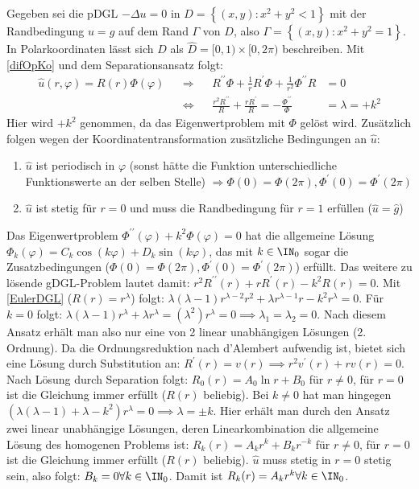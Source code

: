    {\color{gray} Gegeben sei die pDGL $-\Delta u=0  \text{ in } D=\left\{(x, y): x^2+y^2<1\right\}$ mit der Randbedingung $u=g$ auf dem Rand $\Gamma$ von $D$, also $\Gamma=\left\{(x, y): x^2+y^2=1\right\}$. In Polarkoordinaten lässt sich $D$ als $\hat{D}=[0,1) \times[0,2 \pi)$ beschreiben. Mit \ref{difOpKo} und dem Separationsansatz folgt: 
    	\begin{align*}
    		\hat{u}(r,\varphi)=R(r)\Phi(\varphi)&&\Rightarrow&& R^{\prime\prime}\Phi+\frac{1}{r}R^\prime\Phi+\frac{1}{r^2}\Phi^{\prime\prime}R&=0\\
    		&&\Leftrightarrow&& \frac{r^2R^{\prime\prime}}{R}+\frac{rR^\prime}{R}=-\frac{\Phi^{\prime\prime}}{\Phi}&=\lambda=+k^2
    	\end{align*}
    	Hier wird $+k^2$ genommen, da das Eigenwertproblem mit $\Phi$ gelöst wird. Zusätzlich folgen wegen der Koordinatentransformation zusätzliche Bedingungen an $\hat{u}$:
    	\begin{enumerate}
    		\item $\hat{u}$ ist periodisch in $\varphi$ (sonst hätte die Funktion unterschiedliche Funktionswerte an der selben Stelle) $\Rightarrow \Phi(0)=\Phi(2\pi),\Phi^\prime(0)=\Phi^\prime(2\pi) $ 
    		\item $\hat{u}$ ist stetig für $r=0$ und muss die Randbedingung für $r=1$ erfüllen ($\hat{u}=\hat{g}$)
    	\end{enumerate}
    	Das Eigenwertproblem $\Phi^{\prime\prime}(\varphi)+k^2\Phi(\varphi)=0$ hat die allgemeine Lösung $\Phi_k(\varphi)=C_k\cos (k\varphi)+D_k\sin (k\varphi)$, das mit $k\in \IN_0$ sogar die Zusatzbedingungen ($\Phi(0)=\Phi(2\pi),\Phi^\prime(0)=\Phi^\prime(2\pi) $) erfüllt. Das weitere zu lösende gDGL-Problem lautet damit: $r^2 R^{\prime \prime}(r)+r R^\prime(r)-k^2 R(r)=0.
    	$ Mit \ref{EulerDGL} ($R(r)=r^\lambda$) folgt: $\lambda(\lambda-1)r^{\lambda-2}r^2+\lambda r^{\lambda-1}r-k^2r^\lambda=0$. Für $k=0$ folgt: $\lambda(\lambda-1)r^{\lambda}+\lambda r^{\lambda}=(\lambda^2)r^\lambda=0\implies \lambda_1=\lambda_2=0$. Nach diesem Ansatz erhält man also nur eine von 2 linear unabhängigen Lösungen (2. Ordnung). Da die Ordnungsreduktion nach d'Alembert aufwendig ist, bietet sich eine Lösung durch Substitution an: $R^\prime(r)=v(r)\implies r^2 v^\prime(r)+r v(r)=0$. Nach Lösung durch Separation folgt: $R_0(r)=A_0\ln r +B_0$ für $r\neq 0$, für $r=0$ ist die Gleichung immer erfüllt ($R(r)$ beliebig). Bei $k\neq 0$ hat man hingegen $\left(\lambda(\lambda-1)+\lambda-k^2\right)r^\lambda=0 \implies \lambda=\pm k$. Hier erhält man durch den Ansatz zwei linear unabhängige Lösungen, deren Linearkombination die allgemeine Lösung des homogenen Problems ist: $R_k(r)=A_kr^k+B_kr^{-k}$ für $r\neq 0$, für $r=0$ ist die Gleichung immer erfüllt ($R(r)$ beliebig). $\hat{u}$ muss stetig in $r=0$ stetig sein, also folgt: $B_k=0\forall k\in \IN_0$. Damit ist $R_k(r)=A_kr^k\forall k\in \IN_0$.\\
}
